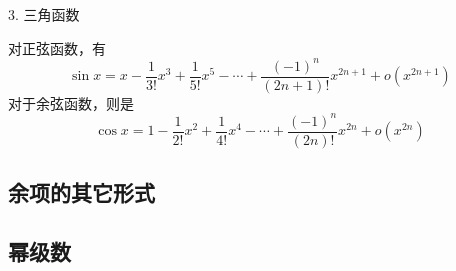 3. 三角函数

对正弦函数，有
\[ \sin{x} = x - \frac{1}{3!}x^3 + \frac{1}{5!} x^5 - \cdots + \frac{(-1)^n}{(2n+1)!}x^{2n+1} + o(x^{2n+1}) \]
对于余弦函数，则是
\[ \cos{x} = 1 - \frac{1}{2!}x^2 + \frac{1}{4!}x^4 - \cdots + \frac{(-1)^n}{(2n)!}x^{2n} + o(x^{2n}) \]

\subsection{余项的其它形式}
\label{sec:other-format-of-taylor-additional}

\subsection{幂级数}
\label{sec:power-series}



